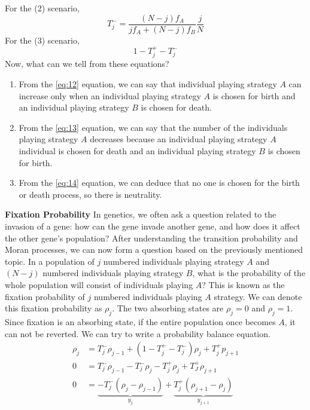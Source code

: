\documentclass{article}
\begin{document}
For the (2) scenario,
\begin{equation}
T_j^-=\frac{(N-j)f_A}{jf_A+(N-j)f_B}\frac{j}{N} \label{eq:15}
\end{equation}
For the (3) scenario,
\begin{equation}
1-T_j^+-T_j^- \label{eq:16}
\end{equation}
Now, what can we tell from these equations?
\begin{enumerate}
\item From the \eqref{eq:12} equation, we can say that  individual playing strategy $A$ can increase only when an individual playing strategy $A$  is chosen for birth and an individual playing strategy $B$  is chosen for death.
\item From the \eqref{eq:13} equation, we can say that the number of the individuals playing strategy $A$ decreases because an individual playing strategy $A$ individual is chosen for death and an individual playing strategy $B$ is chosen for birth.
\item From the \eqref{eq:14} equation, we can deduce that no one is chosen for the birth or death process, so there is neutrality.
\end{enumerate}
\textbf{Fixation Probability}
\newline
In genetics, we often ask a question related to the invasion of a gene: how can the gene invade another gene, and how does it affect the other gene's population?
After understanding the transition probability and Moran processes, we can now form a question based on the previously mentioned topic.
In a population of $j$ numbered individuals playing strategy $A$ and $(N-j)$ numbered individuals playing strategy $B$, what is the probability of the whole population will consist of individuals playing $A$?
This is known as the fixation probability of $j$ numbered individuals playing $A$ strategy.
We can denote this fixation probability as $\rho_j$.
The two absorbing states are $\rho_j=0$ and $\rho_j=1$.
Since fixation is an absorbing state, if the entire population once becomes $A$, it can not be reverted. We can try to write a probability balance equation.
\begin{align}
\rho_j &= T_j^-\rho_{j-1}+(1-T_j^+ - T_j^-)\rho_j + T_j^+p_{j+1} \nonumber\\
0 &= T_j^-\rho_{j-1} - T_j^-\rho_j - T_j^+\rho_j + T_J^+\rho_{j+1}\nonumber\\
0 &= \underbrace{-T^-_j (\rho_j - \rho_{j-1})}_{y_j} + \underbrace{T^+_j (\rho_{j+1} - \rho_j)}_{y_{j+1}} \label{eq:17}
\end{align}
\end{document}
